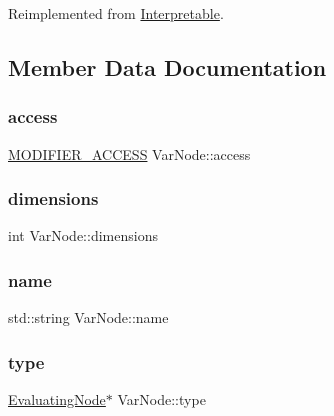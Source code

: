Reimplemented from \hyperlink{classInterpretable_a32f547aaf68dcbab993284d3257ab010}{Interpretable}.



\subsection{Member Data Documentation}
\mbox{\label{classVarNode_a9d3115ee1b8fde5fe1b9484b57dba54a}} 
\subsubsection{\texorpdfstring{access}{access}}
{\footnotesize\ttfamily \hyperlink{statics_8h_a0cbe4939ec6da73b52afbebd794d60ba}{M\+O\+D\+I\+F\+I\+E\+R\+\_\+\+A\+C\+C\+E\+SS} Var\+Node\+::access}

\mbox{\label{classVarNode_a408a93fc558984318fb6fdad5cb36077}} 
\subsubsection{\texorpdfstring{dimensions}{dimensions}}
{\footnotesize\ttfamily int Var\+Node\+::dimensions}

\mbox{\label{classVarNode_adcfff85229e23fb0670fa3fc14b830e0}} 
\subsubsection{\texorpdfstring{name}{name}}
{\footnotesize\ttfamily std\+::string Var\+Node\+::name}

\mbox{\label{classVarNode_a8aff9f630482d9f8570dd9feb10849cd}} 
\subsubsection{\texorpdfstring{type}{type}}
{\footnotesize\ttfamily \hyperlink{classEvaluatingNode}{Evaluating\+Node}$\ast$ Var\+Node\+::type}

\mbox{\label{classVarNode_a58798cdece4226f1e0b844c8cbcd5146}} 
